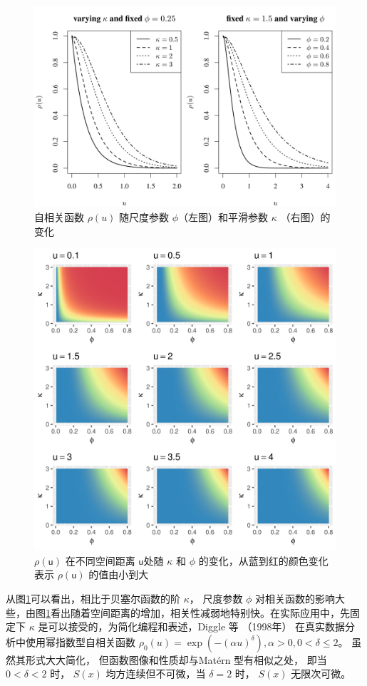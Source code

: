 \documentclass[12pt,a4paper,UTF8,twoside]{book}
\theoremstyle{definition}
\theoremstyle{definition}
\theoremstyle{definition}
\theoremstyle{remark}
\begin{document}
\begin{figure}

{\centering \includegraphics[width=0.8\linewidth]{figures/matern} 

}

\caption{自相关函数 $\rho(u)$ 随尺度参数 $\phi$（左图）和平滑参数 $\kappa$ （右图）的变化}\label{fig:matern-2d}
\end{figure}
\begin{figure}

{\centering \includegraphics[width=0.8\linewidth]{figures/matern-3d} 

}

\caption{$\rho(\mathsf{u})$ 在不同空间距离 $\mathsf{u}$处随 $\kappa$ 和 $\phi$ 的变化，从蓝到红的颜色变化表示 $\rho(\mathsf{u})$ 的值由小到大}\label{fig:matern-3d}
\end{figure}

从图\ref{fig:matern-2d}可以看出，相比于贝塞尔函数的阶 \(\kappa\)，
尺度参数 \(\phi\)
对相关函数的影响大些，由图\ref{fig:matern-2d}看出随着空间距离的增加，相关性减弱地特别快。在实际应用中，先固定下
\(\kappa\) 是可以接受的，为简化编程和表述，Diggle 等 （1998年）
\citep{Diggle1998} 在真实数据分析中使用幂指数型自相关函数
\(\rho_{0}(u) = \exp(-(\alpha u)^{\delta}), \alpha > 0, 0 < \delta \leq 2\)。
虽然其形式大大简化， 但函数图像和性质却与Matérn 型有相似之处， 即当
\(0 < \delta < 2\) 时， \(S(x)\) 均方连续但不可微，当 \(\delta = 2\)
时， \(S(x)\) 无限次可微。
\end{document}
